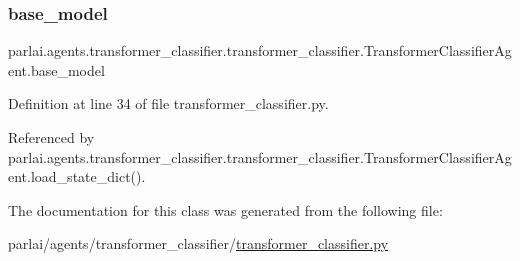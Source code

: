 \subsubsection{\texorpdfstring{base\+\_\+model}{base\_model}}
{\footnotesize\ttfamily parlai.\+agents.\+transformer\+\_\+classifier.\+transformer\+\_\+classifier.\+Transformer\+Classifier\+Agent.\+base\+\_\+model}



Definition at line 34 of file transformer\+\_\+classifier.\+py.



Referenced by parlai.\+agents.\+transformer\+\_\+classifier.\+transformer\+\_\+classifier.\+Transformer\+Classifier\+Agent.\+load\+\_\+state\+\_\+dict().



The documentation for this class was generated from the following file\+:\begin{DoxyCompactItemize}
\item 
parlai/agents/transformer\+\_\+classifier/\hyperlink{transformer__classifier_8py}{transformer\+\_\+classifier.\+py}\end{DoxyCompactItemize}
